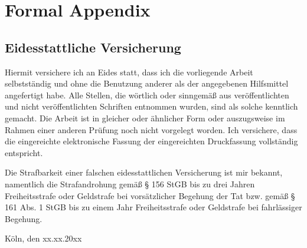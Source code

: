 \clearpage

\section{Formal Appendix}
\label{app:Formal A}

\subsection{Eidesstattliche Versicherung}
\label{sec:SOOA}

\vspace{2.5cm}


Hiermit versichere ich an Eides statt, dass ich die vorliegende Arbeit selbstständig und ohne die Benutzung anderer als der angegebenen Hilfsmittel angefertigt habe. Alle Stellen, die wörtlich oder sinngemäß aus veröffentlichten und nicht veröffentlichten Schriften entnommen wurden, sind als solche kenntlich gemacht. Die Arbeit ist in gleicher oder ähnlicher Form oder auszugsweise im Rahmen einer anderen Prüfung noch nicht vorgelegt worden. Ich versichere, dass die eingereichte elektronische Fassung der eingereichten Druckfassung vollständig entspricht.

\vspace{1cm}

\noindent
Die Strafbarkeit einer falschen eidesstattlichen Versicherung ist mir bekannt, namentlich die Strafandrohung gemäß § 156 StGB bis zu drei Jahren Freiheitsstrafe oder Geldstrafe bei vorsätzlicher Begehung der Tat bzw. gemäß § 161 Abs. 1 StGB bis zu einem Jahr Freiheitsstrafe oder Geldstrafe bei fahrlässiger Begehung.

\vspace{3cm}
\noindent
\textbf{\thesisauthor{}}

\vspace{0.5cm}
\noindent
Köln, den xx.xx.20xx


